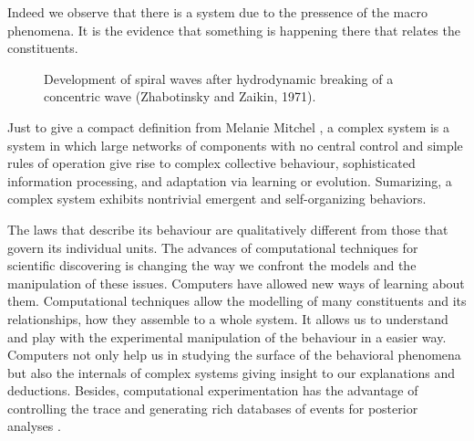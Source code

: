 \documentclass[11pt,oneside,a4paper,openright]{report}
\begin{document}
Indeed we observe that there is a system due to the pressence of the macro phenomena. It is the evidence that
something is happening there that relates the constituents.\\

\begin{figure}[h]
\centering
\setlength\fboxsep{0pt}
\setlength\fboxrule{0.5pt}
\caption{ Development of spiral waves after hydrodynamic breaking of a concentric wave (Zhabotinsky and Zaikin, 1971).}
\label{fig:ZhaboZaikin_1}
\end{figure}





Just to give a compact definition from Melanie Mitchel \cite{MelanieMitchell2009}, a complex system is a system in
which large networks of components with no central control and simple rules of operation give rise to complex collective behaviour, sophisticated information processing, and adaptation via learning or evolution. Sumarizing, a complex system exhibits nontrivial emergent and self-organizing behaviors.

The laws that describe its behaviour are qualitatively different from those that govern its individual units.
The advances of computational techniques for scientific discovering is changing the way we confront the models 
and the manipulation of these issues. Computers have allowed new ways of learning about them. Computational techniques 
allow the modelling of many constituents and its relationships, how they assemble to a whole system. It allows us 
to understand and play with the experimental manipulation of the behaviour in a easier way. Computers not only help 
us in studying the surface of the behavioral phenomena but also the internals of complex systems giving insight 
to our explanations and deductions. Besides, computational experimentation has the advantage of controlling the trace 
and generating rich databases of events for posterior analyses \cite{Vicsek2002}.
\end{document}
